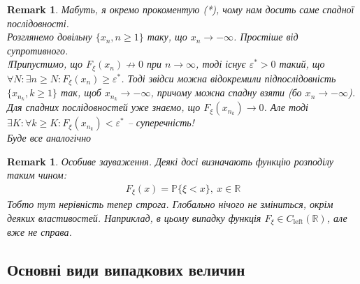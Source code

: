 \documentclass[a4paper, 10pt]{article}
\theoremstyle{theoremdd}
\newtheorem{remark}[theorem]{Remark}
\begin{document}
\begin{remark}
Мабуть, я окремо прокоментую (*), чому нам досить саме спадної послідовності.\\
Розглянемо довільну $\{x_n,n \geq 1\}$ таку, що $x_n \to -\infty$. Простіше від супротивного.\\
!Припустимо, що $F_\xi(x_n) \not\to 0$ при $n \to \infty$, тоді існує $\varepsilon^* > 0$ такий, що $\forall N: \exists n \geq N: F_\xi(x_n) \geq \varepsilon^*$. Тоді звідси можна відокремили підпослідовність $\{x_{n_k}, k \geq 1\}$ так, щоб $x_{n_k} \to -\infty$, причому можна спадну взяти (бо $x_n \to -\infty$). Для спадних послідовностей уже знаємо, що $F_\xi(x_{n_k}) \to 0$. Але тоді $\exists K: \forall k \geq K: F_\xi(x_{n_k}) < \varepsilon^*$ -- суперечність!\\
Буде все аналогічно
\end{remark}

\begin{remark}
Особиве зауваження. Деякі досі визначають функцію розподілу таким чином:
\begin{align*}
F_\xi(x) = \mathbb{P}\{\xi < x\},\ x \in \mathbb{R}
\end{align*}
Тобто тут нерівність тепер строга. Глобально нічого не зміниться, окрім деяких властивостей. Наприклад, в цьому випадку функція $F_\xi \in C_{\text{left}}(\mathbb{R})$, але вже не справа.
\end{remark}

\subsection{Основні види випадкових величин}
\end{document}
